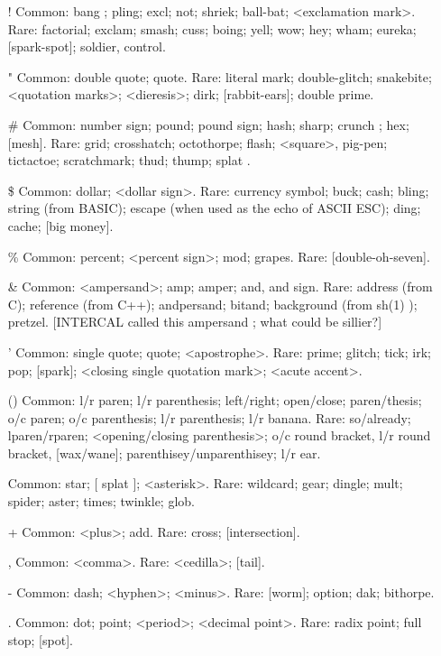 \documentclass[10pt,twoside,openright]{memoir}
\begin{document}
\begin{itemize}


\item[{\ttfamily !}] Common: bang ; pling; excl; not; shriek; ball-bat; <exclamation mark>. Rare: factorial; exclam; smash; cuss; boing; yell; wow; hey; wham; eureka; [spark-spot]; soldier, control.
\item[{\ttfamily "}] Common: double quote; quote. Rare: literal mark; double-glitch; snakebite; <quotation marks>; <dieresis>; dirk; [rabbit-ears]; double prime.
\item[{\ttfamily \#}] Common: number sign; pound; pound sign; hash; sharp; crunch ; hex; [mesh]. Rare: grid; crosshatch; octothorpe; flash; <square>, pig-pen; tictactoe; scratchmark; thud; thump; splat .
\item[{\ttfamily \$}] Common: dollar; <dollar sign>. Rare: currency symbol; buck; cash; bling; string (from BASIC); escape (when used as the echo of ASCII ESC); ding; cache; [big money].
\item[{\ttfamily \%}] Common: percent; <percent sign>; mod; grapes. Rare: [double-oh-seven].
\item[{\ttfamily \&}] Common: <ampersand>; amp; amper; and, and sign. Rare: address (from C); reference (from C++); andpersand; bitand; background (from sh(1) ); pretzel. [INTERCAL called this ampersand ; what could be sillier?]
\item[{\ttfamily '}] Common: single quote; quote; <apostrophe>. Rare: prime; glitch; tick; irk; pop; [spark]; <closing single quotation mark>; <acute accent>.
\item[{\ttfamily ()}] Common: l/r paren; l/r parenthesis; left/right; open/close; paren/thesis; o/c paren; o/c parenthesis; l/r parenthesis; l/r banana. Rare: so/already; lparen/rparen; <opening/closing parenthesis>; o/c round bracket, l/r round bracket, [wax/wane]; parenthisey/unparenthisey; l/r ear.
\item[{\ttfamily *}] Common: star; [ splat ]; <asterisk>. Rare: wildcard; gear; dingle; mult; spider; aster; times; twinkle; glob.
\item[{\ttfamily +}] Common: <plus>; add. Rare: cross; [intersection].
\item[{\ttfamily ,}] Common: <comma>. Rare: <cedilla>; [tail].
\item[{\ttfamily -}] Common: dash; <hyphen>; <minus>. Rare: [worm]; option; dak; bithorpe.
\item[{\ttfamily .}] Common: dot; point; <period>; <decimal point>. Rare: radix point; full stop; [spot].

\end{itemize}
\end{document}

